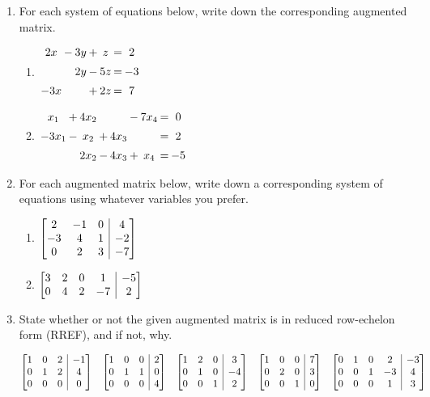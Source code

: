 \documentclass[12pt]{article}
\makeatletter
\newenvironment{amatrix}[1]{%
  \left[\begin{array}{@{}*{#1}{c}|c@{}}
}{%
  \end{array}\right]
}
\newcommand{\bam}{\begin{amatrix}}
\newcommand{\eam}{\end{amatrix}}
\makeatother
\begin{document}
 \begin{enumerate}
\item For each system of equations below, write down the corresponding augmented matrix.
\begin{multicols}{2}
\begin{enumerate}
 \item $\arraycolsep=1pt\begin{array}{ccccccc}2x&-&3y&+&z&=&2\\[5pt] & &2y&-&5z&=&-3\\[5pt] -3x& & &+&2z&=&7\end{array}$



 \item $\arraycolsep=1pt\begin{array}{ccccccccc}x_1&+&4x_2& & &-&7x_4&=&0\\[5pt]-3x_1&-&x_2&+&4x_3& & &=&2\\[5pt] & &2x_2&-&4x_3&+&x_4&=&-5\end{array}$
 \end{enumerate}
\end{multicols}


\vspace{3.5cm}


\item For each augmented matrix below, write down a corresponding system of equations using whatever variables you prefer.
\begin{multicols}{2}
\begin{enumerate}
 \item $\bam{3}2&-1&0&4\\-3&4&1&-2\\0&2&3&-7\eam$



 \item $\bam{4}3&2&0&1&-5\\0&4&2&-7&2\eam$
\end{enumerate}
\end{multicols}

\vspace{4cm}

\item State whether or not the given augmented matrix is in reduced row-echelon form (RREF), and if not, why.

\[
 \bam{3}1&0&2&-1\\0&1&2&4\\0&0&0&0\eam \quad \bam{3}1&0&0&2\\0&1&1&0\\0&0&0&4\eam \quad \bam{3}1&2&0&3\\0&1&0&-4\\0&0&1&2\eam \quad \bam{3}1&0&0&7\\0&2&0&3\\0&0&1&0\eam 
\quad \bam{4}0&1&0&2&-3\\0&0&1&-3&4\\0&0&0&1&3\eam
\]


\end{enumerate}
\end{document}
